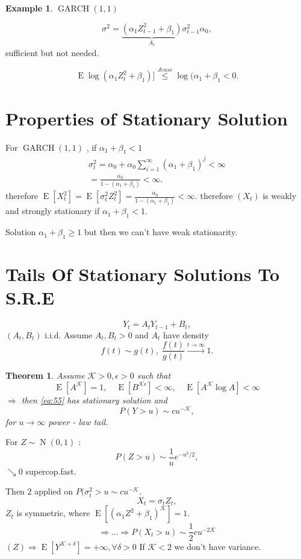 \documentclass[12pt,a4paper, notitlepage]{book}
\theoremstyle{definition} %
\newtheorem{example}[definition]{Example}
\theoremstyle{plain} %
\newtheorem{theorem}[definition]{Theorem}
\DeclareMathOperator{\E}{E}
\DeclareMathOperator{\No}{N}
\DeclareMathOperator{\Garch}{GARCH}
\begin{document}
\begin{example} $ \Garch(1,1) $

\[ \sigma^2 = \underbrace{ (\alpha_1 Z_{t-1}^2 + \beta_1)}_{A_t}  \sigma_{t-1}^2 \alpha_0 , \]
sufficient but not needed. 

\[ \E \log(\alpha_1 Z_t^2 + \beta_1)]  \overset{Jense}{\leq} \log(\alpha_1 + \beta_1 < 0 . \]


\section{ Properties of Stationary Solution}

For $ \Garch(1,1) $ , if $ \alpha _1 + \beta _1 <1 $
\begin{align*}
 \sigma _t ^2 = \alpha_0 + \alpha_0 \sum_{i=1}^{\infty}(\alpha_1 + \beta_1)^j < \infty \\
= \frac{\alpha_0}{1 - (\alpha_1 + \beta_1)} < \infty . 
\end{align*}
therefore $ \E[X_t^2 ] = \E[\sigma_t^2 Z_t^2] = \frac{\alpha_0}{1- (\alpha_1 + \beta_1)} < \infty . $
therefore $ (X_t) $ is weakly and strongly stationary if $ \alpha_1 + \beta_1 < 1 $.

Solution $ \alpha_1 + \beta_1 \geq 1 $ but then we can't have weak stationarity.

\section{Tails Of Stationary Solutions To S.R.E}

\[ Y_t = A_t Y_{t-1} + B_t, \]
$(A_t, B_t) $ i.i.d. Assume $ A_t, B_t > 0 $ and $ A_t $ have density 
\[ f(t) \sim g(t) , \; \frac{f(t)}{g(t)} \overset{t \to \infty}{\rightarrow } 1 . \]
\end{example}


\begin{theorem}
Assume $ \mathcal{K} > 0 , \epsilon > 0 $ such that 
\[ \E[A^{\mathcal{K}}] =1, \quad \E[ B^{\mathcal{K} \epsilon} ] < \infty, \quad \E[ A^{\mathcal{K}} \log A] < \infty \]
$ \Rightarrow $  then \ref{eq:55}  has stationary solution and 
\[ P(Y> u) \sim c u^{- \mathcal{K}} , \]
for $ u \to \infty $ power - law tail.
\end{theorem}

For $ Z \sim \No(0,1) $ :
\[ P(Z > u) \sim \frac{1}{u} e^{-u^2 /2} , \]
$ \searrow 0 $ supercop.fast.

Then $ 2 $ applied on $ P( \sigma_t^2  > u \sim c u ^{-\mathcal{K}} $.
\[ X_t = \sigma_t Z_t, \]
$ Z_t  $ is symmetric, where $ \E[ (\alpha_1 Z^2 + \beta_1)^{\mathcal{K}} ] =1 $.
\[ \Rightarrow \ldots \Rightarrow P(X_t >u) \sim \frac{1}{2} c u ^{-2 \mathcal{K}} \]
$ (Z) \Rightarrow \E[ Y^{\mathcal{K} + \delta} ] =  + \infty , \forall \delta > 0 $
If $ \mathcal{K}  < 2 $ we don't have variance.
\end{document}
